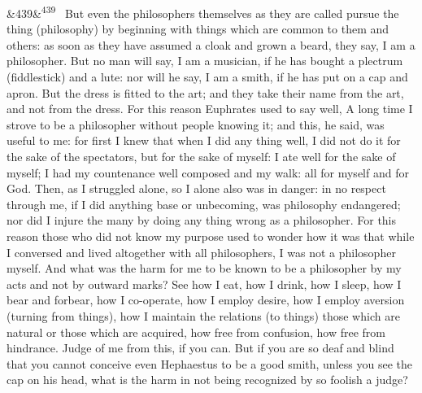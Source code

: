 \documentclass[12pt]{article}
\newcommand{\para}[1][]{\par\noindent\ifx&#1&\else\textsuperscript{\footnotesize #1}~\fi}
\begin{document}
\para[439] But even the philosophers themselves as they are called pursue the thing (philosophy) by beginning with things which are common to them and others: as soon as they have assumed a cloak and grown a beard, they say, I am a philosopher. But no man will say, I am a musician, if he has bought a plectrum (fiddlestick) and a lute: nor will he say, I am a smith, if he has put on a cap and apron. But the dress is fitted to the art; and they take their name from the art, and not from the dress. For this reason Euphrates used to say well, A long time I strove to be a philosopher without people knowing it; and this, he said, was useful to me: for first I knew that when I did any thing well, I did not do it for the sake of the spectators, but for the sake of myself: I ate well for the sake of myself; I had my countenance well composed and my walk: all for myself and for God. Then, as I struggled alone, so I alone also was in danger: in no respect through me, if I did anything base or unbecoming, was philosophy endangered; nor did I injure the many by doing any thing wrong as a philosopher. For this reason those who did not know my purpose used to wonder how it was that while I conversed and lived altogether with all philosophers, I was not a philosopher myself. And what was the harm for me to be known to be a philosopher by my acts and not by outward marks? See how I eat, how I drink, how I sleep, how I bear and forbear, how I co-operate, how I employ desire, how I employ aversion (turning from things), how I maintain the relations (to things) those which are natural or those which are acquired, how free from confusion, how free from hindrance. Judge of me from this, if you can. But if you are so deaf and blind that you cannot conceive even Hephaestus to be a good smith, unless you see the cap on his head, what is the harm in not being recognized by so foolish a judge?
\end{document}
